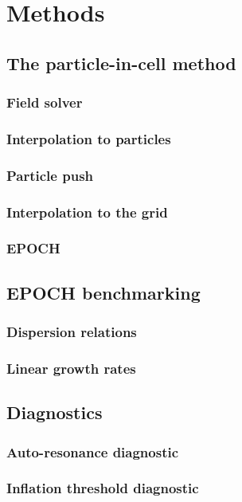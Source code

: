 \chapter{Methods}
\label{chp:methods}

\section{The particle-in-cell method}
\subsection{Field solver}
\subsection{Interpolation to particles}
\subsection{Particle push}
\subsection{Interpolation to the grid}
\subsection{EPOCH}


\section{EPOCH benchmarking}
\subsection{Dispersion relations}
\subsection{Linear growth rates}




\section{Diagnostics}
\subsection{Auto-resonance diagnostic}
\subsection{Inflation threshold diagnostic}